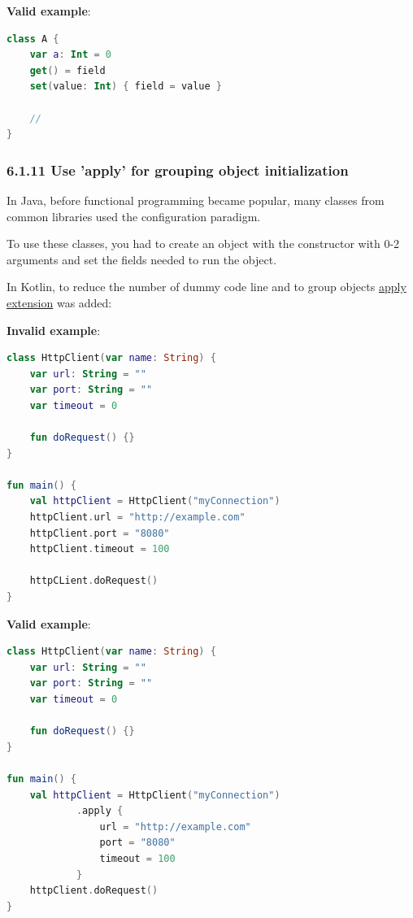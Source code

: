 \textbf{Valid example}:

\begin{lstlisting}[language=Kotlin]
class A {
    var a: Int = 0 
    get() = field
    set(value: Int) { field = value }

    //
}
\end{lstlisting}


\subsubsection*{\textbf{6.1.11 Use 'apply' for grouping object initialization}}
\leavevmode\newline

\label{sec:6.1.11}

In Java, before functional programming became popular, many classes from common libraries used the configuration paradigm.

To use these classes, you had to create an object with the constructor with 0-2 arguments and set the fields needed to run the object.

In Kotlin, to reduce the number of dummy code line and to group objects \href{https://kotlinlang.org/api/latest/jvm/stdlib/kotlin/apply.html}{apply extension} was added:  

 

\textbf{Invalid example}:

\begin{lstlisting}[language=Kotlin]
class HttpClient(var name: String) {
    var url: String = ""
    var port: String = ""
    var timeout = 0
    
    fun doRequest() {}
}

fun main() {
    val httpClient = HttpClient("myConnection")
    httpClient.url = "http://example.com"
    httpClient.port = "8080"
    httpClient.timeout = 100
    
    httpCLient.doRequest()
}   

\end{lstlisting}


\textbf{Valid example}:

\begin{lstlisting}[language=Kotlin]
class HttpClient(var name: String) {
    var url: String = ""
    var port: String = ""
    var timeout = 0

    fun doRequest() {}
}

fun main() {
    val httpClient = HttpClient("myConnection")
            .apply {
                url = "http://example.com"
                port = "8080"
                timeout = 100
            }
    httpClient.doRequest()
}
\end{lstlisting}


